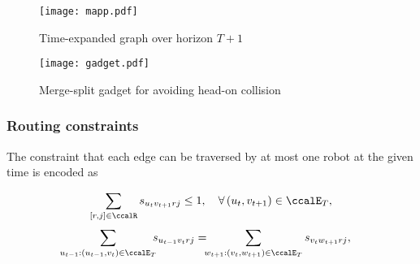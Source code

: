 \documentclass[journal]{IEEEtran}
\begin{document}
{\begin{figure}[t]
  \centering
  \texttt{[image: mapp.pdf]}
  \caption{Time-expanded graph over horizon $T+1$}
  \label{fig:mapp}
\end{figure}

\begin{figure}[t]
  \centering
  \texttt{[image: gadget.pdf]}
  \caption{Merge-split gadget for avoiding head-on collision}
  \label{fig:gadget}
\end{figure}
\subsubsection{Routing constraints}
The constraint that each edge can be traversed by at most one robot at the given time is encoded as}
\begingroup\makeatletter{}\check@mathfonts
\def\maketag@@@#1{\hbox{\m@th\normalsize\normalfont#1}}%
\begin{align}
  \sum_{[r,j] \in \ccalR} s_{u_t v_{t+1}rj} \leq 1, \quad \forall \,(u_t,v_{t+1}) \in \ccalE_T,
\end{align}
\endgroup
{}
\begingroup\makeatletter\def\f@size{9}\check@mathfonts
\def\maketag@@@#1{\hbox{\m@th\normalsize\normalfont#1}}%
\begingroup
  \begin{align}\label{equ:flow}
  \sum_{u_{t-1}:(u_{t-1}, v_t) \in \ccalE_T} \!\! \! s_{u_{t-1} v_t rj} &  = \!\!\!  \sum_{w_{t+1}:(v_t, w_{t+1}) \in \ccalE_T} s_{v_t w_{t+1} rj},
  \end{align}
\endgroup
{}
\begingroup\makeatletter\def\f@size{9}\check@mathfonts
\def\maketag@@@#1{\hbox{\m@th\normalsize\normalfont#1}}%
\begingroup
\end{document}
